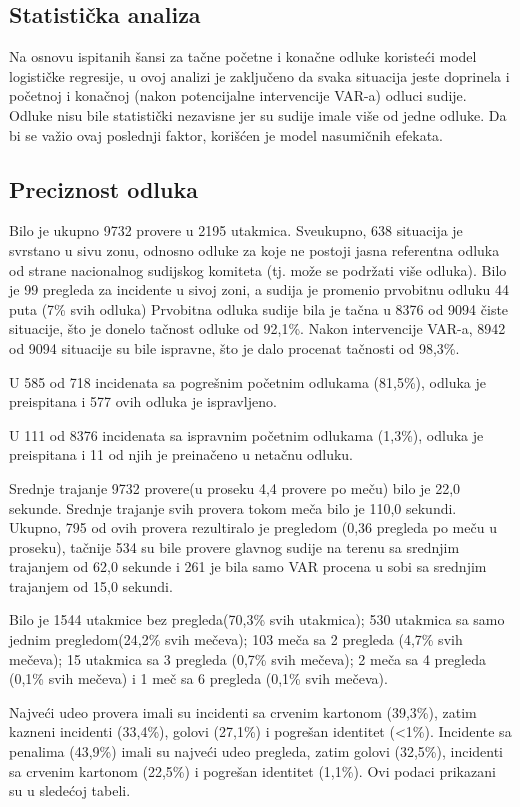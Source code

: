 \documentclass[a4paper]{article}
\begin{document}
\subsection{Statistička analiza}
Na osnovu ispitanih šansi za tačne početne i konačne odluke koristeći model logističke regresije, u ovoj analizi je zaključeno da svaka situacija jeste doprinela i početnoj i konačnoj (nakon potencijalne intervencije VAR-a) odluci sudije. Odluke nisu bile statistički nezavisne jer su sudije imale više od jedne odluke. Da bi se važio ovaj poslednji faktor, korišćen je model nasumičnih efekata. 


\subsection{Preciznost odluka} 
Bilo je ukupno 9732 provere u 2195 utakmica. Sveukupno, 638 situacija je svrstano u sivu zonu, odnosno odluke za koje ne postoji jasna referentna odluka od strane nacionalnog sudijskog komiteta (tj. može se podržati više odluka). Bilo je 99 pregleda za incidente u sivoj zoni, a sudija je promenio prvobitnu odluku 44 puta (7\% svih odluka)
Prvobitna odluka sudije bila je tačna u 8376 od 9094 čiste situacije, što je donelo tačnost odluke od 92,1\%. Nakon intervencije VAR-a, 8942 od 9094 situacije su bile ispravne, što je dalo procenat tačnosti od 98,3\%.  

U 585 od 718 incidenata sa pogrešnim početnim odlukama (81,5\%), odluka je preispitana i 577 ovih odluka je ispravljeno. 

U 111 od 8376 incidenata sa ispravnim početnim odlukama (1,3\%), odluka je preispitana i 11 od njih je preinačeno u netačnu odluku. 

Srednje trajanje 9732 provere(u proseku 4,4 provere po meču) bilo je 22,0 sekunde. Srednje trajanje svih provera tokom meča bilo je 110,0 sekundi. 
Ukupno, 795 od ovih provera rezultiralo je pregledom (0,36 pregleda po meču u proseku), tačnije 534 su bile provere glavnog sudije na terenu sa srednjim trajanjem od 62,0 sekunde i 261 je bila samo VAR procena u sobi sa srednjim trajanjem od 15,0 sekundi. 

Bilo je 1544 utakmice bez pregleda(70,3\% svih utakmica); 530 utakmica sa samo jednim pregledom(24,2\% svih mečeva); 103 meča sa 2 pregleda (4,7\% svih mečeva); 15 utakmica sa 3 pregleda (0,7\% svih mečeva); 2 meča sa 4 pregleda (0,1\% svih mečeva) i 1 meč sa 6 pregleda (0,1\% svih mečeva).

Najveći udeo provera imali su incidenti sa crvenim kartonom (39,3\%), zatim kazneni incidenti (33,4\%), golovi (27,1\%) i pogrešan identitet (<1\%). Incidente sa penalima (43,9\%) imali su najveći udeo pregleda, zatim golovi (32,5\%), incidenti sa crvenim kartonom (22,5\%) i pogrešan identitet (1,1\%). Ovi podaci prikazani su u sledećoj tabeli.
\end{document}
